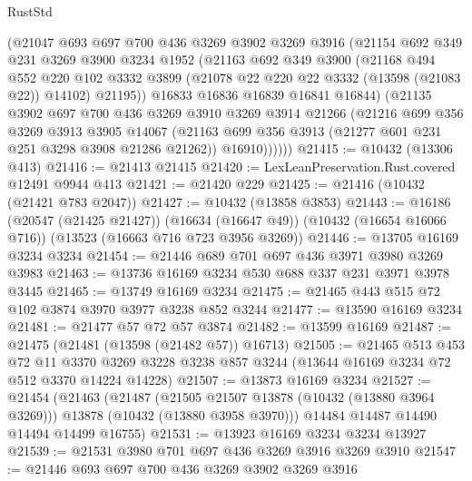 \begin{lexlean}{RustStd}
\begin{coremodule}
          (@21047
            @693
            @697
            @700
            @436
            @3269
            @3902
            @3269
            @3916
            (@21154
              @692
              @349
              @231
              @3269
              @3900
              @3234
              @1952
              (@21163
                @692
                @349
                @3900
                (@21168
                  @494
                  @552
                  @220
                  @102
                  @3332
                  @3899
                  (@21078 @22 @220 @22 @3332 (@13598 (@21083 @22)) @14102)
                  @21195))
              @16833
              @16836
              @16839
              @16841
              @16844)
            (@21135
              @3902
              @697
              @700
              @436
              @3269
              @3910
              @3269
              @3914
              @21266
              (@21216
                @699
                @356
                @3269
                @3913
                @3905
                @14067
                (@21163 @699 @356 @3913 (@21277 @601 @231 @251 @3298 @3908 @21286 @21262))
                @16910))))))
@21415 := @10432 (@13306 @413)
@21416 := @21413 @21415
@21420 := LexLeanPreservation.Rust.covered @12491 @9944 @413
@21421 := @21420 @229
@21425 := @21416 (@10432 (@21421 @783 @2047))
@21427 := @10432 (@13858 @3853)
@21443 := @16186
    (@20547 (@21425 @21427))
    (@16634 (@16647 @49))
    (@10432 (@16654 @16066 @716))
    (@13523 (@16663 @716 @723 @3956 @3269))
@21446 := @13705 @16169 @3234 @3234
@21454 := @21446 @689 @701 @697 @436 @3971 @3980 @3269 @3983
@21463 := @13736 @16169 @3234 @530 @688 @337 @231 @3971 @3978 @3445
@21465 := @13749 @16169 @3234
@21475 := @21465 @443 @515 @72 @102 @3874 @3970 @3977 @3238 @852 @3244
@21477 := @13590 @16169 @3234
@21481 := @21477 @57 @72 @57 @3874
@21482 := @13599 @16169
@21487 := @21475 (@21481 (@13598 (@21482 @57)) @16713)
@21505 := @21465
    @513
    @453
    @72
    @11
    @3370
    @3269
    @3228
    @3238
    @857
    @3244
    (@13644 @16169 @3234 @72 @512 @3370 @14224 @14228)
@21507 := @13873 @16169 @3234
@21527 := @21454
    (@21463
      (@21487
        (@21505 @21507 @13878 (@10432 (@13880 @3964 @3269)))
        @13878
        (@10432 (@13880 @3958 @3970)))
      @14484
      @14487
      @14490
      @14494
      @14499
      @16755)
@21531 := @13923 @16169 @3234 @3234 @13927
@21539 := @21531 @3980 @701 @697 @436 @3269 @3916 @3269 @3910
@21547 := @21446 @693 @697 @700 @436 @3269 @3902 @3269 @3916

\end{coremodule}
\end{lexlean}
